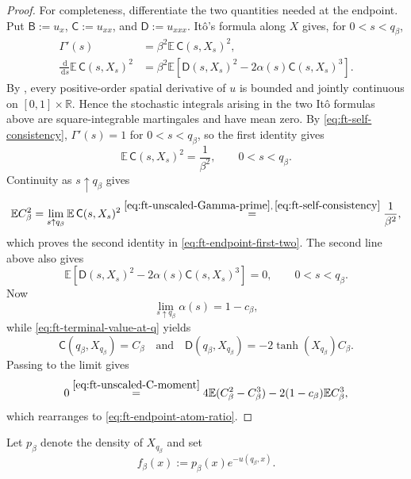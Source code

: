 \documentclass[10pt]{amsart}
\theoremstyle{definition}
\theoremstyle{remark}
\numberwithin{equation}{section}
\newcommand{\R}{\mathbb R}
\newcommand{\E}{\mathbb E}
\newcommand{\1}{\mathbf 1}
\newcommand{\dd}{\,\mathrm d}
\newcommand{\stackref}[2]{\stackrel{#2}{#1}}
\begin{document}
\begin{proof}
For completeness, differentiate the two quantities needed at the endpoint. Put $\mathsf B:=u_x$, $\mathsf C:=u_{xx}$, and $\mathsf D:=u_{xxx}$. It\^o's formula along $X$ gives, for $0<s<q_\beta$,
\begin{align}
 \Gamma'(s)&=\beta^2\E\,\mathsf C(s,X_s)^2,
 \label{eq:ft-unscaled-Gamma-prime}\\
 \frac{\dd}{\dd s}\E\,\mathsf C(s,X_s)^2
 &=\beta^2\E\left[\mathsf D(s,X_s)^2
       -2\alpha(s)\mathsf C(s,X_s)^3\right].
 \label{eq:ft-unscaled-C-moment}
\end{align}
By \cite[Proposition~1(i)]{AuffingerChenProperties}, every positive-order spatial derivative of $u$ is bounded and jointly continuous on $[0,1]\times\R$. Hence the stochastic integrals arising in the two It\^o formulas above are square-integrable martingales and have mean zero. By \eqref{eq:ft-self-consistency}, $\Gamma'(s)=1$ for $0<s<q_\beta$, so the first identity gives
\begin{equation*}
 \E\,\mathsf C(s,X_s)^2=\frac1{\beta^2},
 \qquad 0<s<q_\beta.
\end{equation*}
Continuity as $s\uparrow q_\beta$ gives
\begin{equation*}
 \E C_\beta^2
 =\lim_{s\uparrow q_\beta}\E\,\mathsf C(s,X_s)^2
 \stackref{=}{\eqref{eq:ft-unscaled-Gamma-prime},\,\eqref{eq:ft-self-consistency}}
 \frac1{\beta^2},
\end{equation*}
which proves the second identity in \eqref{eq:ft-endpoint-first-two}. The second line above also gives
\begin{equation*}
 \E\left[\mathsf D(s,X_s)^2-2\alpha(s)\mathsf C(s,X_s)^3\right]=0,
 \qquad 0<s<q_\beta.
\end{equation*}
Now
\begin{equation*}
 \lim_{s\uparrow q_\beta}\alpha(s)=1-c_\beta,
\end{equation*}
while \eqref{eq:ft-terminal-value-at-q} yields
\begin{equation*}
 \mathsf C(q_\beta,X_{q_\beta})=C_\beta
 \quad\text{and}\quad
 \mathsf D(q_\beta,X_{q_\beta})
 =-2\tanh(X_{q_\beta})C_\beta.
\end{equation*}
Passing to the limit gives
\begin{equation*}
 0\stackref{=}{\eqref{eq:ft-unscaled-C-moment}}
 4\E(C_\beta^2-C_\beta^3)
 -2(1-c_\beta)\E C_\beta^3,
\end{equation*}
which rearranges to \eqref{eq:ft-endpoint-atom-ratio}.
\end{proof}

Let $p_\beta$ denote the density of $X_{q_\beta}$ and set
\begin{equation}
 f_\beta(x):=p_\beta(x)e^{-u(q_\beta,x)}.
 \label{eq:ft-endpoint-f}
\end{equation}
\end{document}
